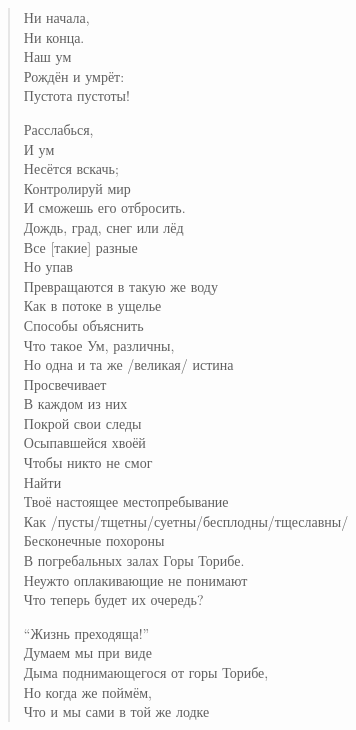 \begin{ver}
\begin{quote}
\begin{verses}
      Ни начала,\\
      Ни конца.\\
      Наш ум\\
      Рождён и умрёт:\\
      Пустота пустоты!
      
      Расслабься,\\
      И ум\\
      Несётся вскачь;\\
      Контролируй мир\\
      И сможешь его отбросить.\\
      
      Дождь, град, снег или лёд\\
      Все [такие] разные\\
      Но упав\\
      Превращаются в такую же воду\\
      Как в потоке в ущелье\\
      
      Способы объяснить\\
      Что такое Ум, различны,\\
      Но одна и та же /великая/ истина\\
      Просвечивает\\
      В каждом из них\\
      
      Покрой свои следы\\
      Осыпавшейся хвоёй\\
      Чтобы никто не смог\\
      Найти\\
      Твоё настоящее местопребывание\\
      
      Как /пусты/тщетны/суетны/бесплодны/тщеславны/\\
      Бесконечные похороны\\
      В погребальных залах Горы Торибе.\\
      Неужто оплакивающие не понимают\\
      Что теперь будет их очередь?
     
      ``Жизнь преходяща!''\\
      Думаем мы при виде\\
      Дыма поднимающегося от горы Торибе,\\
      Но когда же поймём,\\
      Что и мы сами в той же лодке
      

\end{verses}
\end{quote}
\end{ver}
